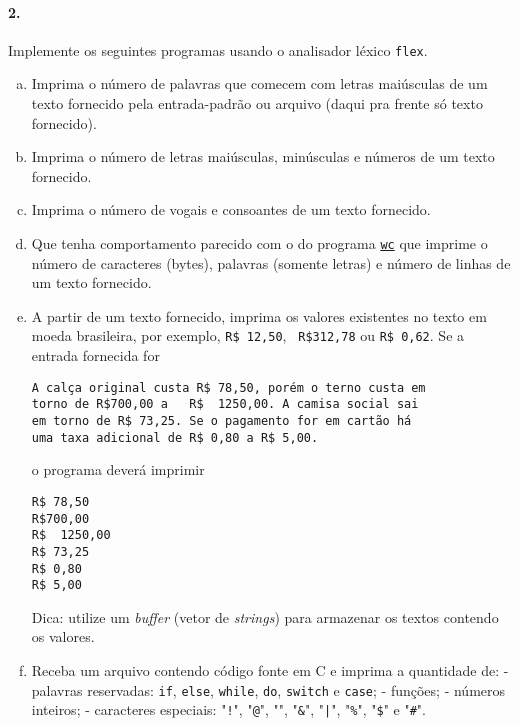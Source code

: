 \paragraph{2.} Implemente os seguintes programas usando o analisador léxico {\tt flex}.

\begin{enumerate}[a)]
\item Imprima o número de palavras que comecem com letras maiúsculas
  de um texto fornecido pela entrada-padrão ou arquivo (daqui pra
  frente só texto fornecido).

\item Imprima o número de letras maiúsculas, minúsculas e números de
  um texto fornecido.

\item Imprima o número de vogais e consoantes de um texto fornecido.

\item Que tenha comportamento parecido com o do programa
  \href{https://pt.wikipedia.org/wiki/Wc}{\tt wc} que imprime o número
        de caracteres (bytes), palavras (somente letras) 
        e número de linhas de um texto fornecido.

\item A partir de um texto fornecido, imprima os valores existentes no
  texto em moeda brasileira, por exemplo, {\tt R\$ 12,50}, {\tt
    R\$312,78} ou {\tt R\$ 0,62}.  Se a entrada fornecida for

\begin{verbatim}
A calça original custa R$ 78,50, porém o terno custa em
torno de R$700,00 a   R$  1250,00. A camisa social sai
em torno de R$ 73,25. Se o pagamento for em cartão há
uma taxa adicional de R$ 0,80 a R$ 5,00.
\end{verbatim}

o programa deverá imprimir

\begin{verbatim}
R$ 78,50
R$700,00
R$  1250,00
R$ 73,25
R$ 0,80
R$ 5,00
\end{verbatim}

Dica: utilize um {\it buffer\/} (vetor de {\it strings\/}) para
armazenar os textos contendo os valores.

\item Receba um arquivo contendo código fonte em C e imprima a quantidade de:
    - palavras reservadas: {\tt if}, {\tt else}, {\tt while}, {\tt do}, {\tt switch} e {\tt case};
    - funções;
    - números inteiros;
    - caracteres especiais: "{\tt !}", "{\tt @}", "{\tt *}", "{\tt \&}", "{\tt |}", "{\tt \%}", "{\tt \$}" e "{\tt \#}".


\end{enumerate}
